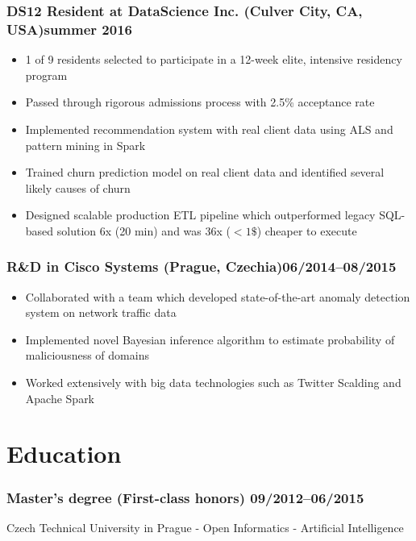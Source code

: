 \documentclass[10pt]{article}
\begin{document}
\subsubsection*{\bf DS12 Resident at DataScience Inc. (Culver City, CA, USA)\hfill summer 2016}
	 \begin{itemize}
		\setlength\itemsep{-0.25em}
		\item 1 of 9 residents selected to participate in a 12-week elite, intensive residency program
		\item Passed through rigorous admissions process with 2.5\% acceptance rate
		\item Implemented recommendation system with real client data using ALS and pattern mining in Spark
		\item Trained churn prediction model on real client data and identified several likely causes of churn
		\item Designed scalable production ETL pipeline which outperformed legacy SQL-based solution 6x (20 min) and was 36x ($< 1\$$) cheaper to execute
	 \end{itemize}

\subsubsection*{R\&D in Cisco Systems (Prague, Czechia)\hfill 06/2014--08/2015}
	 \begin{itemize}
		\setlength\itemsep{-0.25em}
		\item Collaborated with a team which developed state-of-the-art anomaly detection system on network traffic data
		\item Implemented novel Bayesian inference algorithm to estimate probability of maliciousness of domains
		\item Worked extensively with big data technologies such as Twitter Scalding and Apache Spark
	 \end{itemize}

\section*{Education}
\subsubsection*{\bf Master’s degree (First-class honors) \hfill 09/2012--06/2015}
\vspace{-1.5mm}
Czech Technical University in Prague - Open Informatics - Artificial Intelligence
\vspace{-1.5mm}
\end{document}
